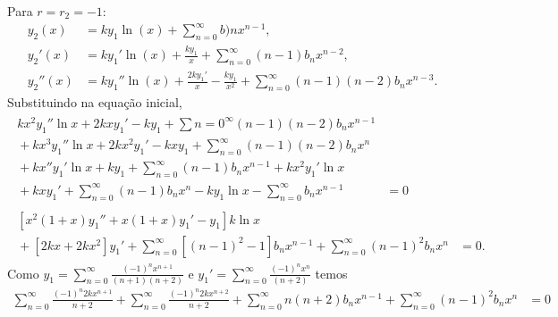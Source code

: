 \documentclass[a4paper,12pt, leqno, answers]{exam}
\begin{document}
\begin{questions}
\begin{solution}
        Para $r = r_2 = -1$:
        \begin{align*}
            y_2(x) &= k y_1 \ln \left( x \right) + \sum_{n = 0}^\infty b)n x^{n - 1}, \\
            y_2'(x) &= k y_1' \ln \left( x \right) + \frac{k y_1}{x} + \sum_{n = 0}^\infty \left( n - 1 \right) b_n x^{n - 2}, \\
            y_2''(x) &= k y_1'' \ln \left( x \right) + \frac{2 k y_1'}{x} - \frac{k y_1}{x^2} + \sum_{n = 0}^\infty \left( n - 1 \right) \left( n - 2 \right) b_n x^{n - 3}.
        \end{align*}
        Substituindo na equa\c{c}\~{a}o inicial,
        \begin{align*}
            \begin{split}
                k x^2 y_1'' \ln x + 2 k x y_1' - k y_1 + \sum{n = 0}^\infty \left( n - 1 \right) \left( n - 2 \right) b_n x^{n - 1} \\ {}+ k x^3 y_1'' \ln x + 2 k x^2 y_1' - k x y_1 + \sum_{n = 0}^\infty \left( n - 1 \right) \left( n - 2 \right) b_n x^n \\ {}+ k x'' y_1' \ln x + k y_1 + \sum_{n = 0}^\infty \left( n - 1 \right) b_n x^{n - 1} + k x^2 y_1' \ln x \\ {}+ k x y_1' + \sum_{n = 0}^\infty \left( n - 1 \right) b_n x^n - k y_1 \ln x - \sum_{n = 0}^\infty b_n x^{n - 1} &= 0
            \end{split} \\
            \begin{split}
                \left[ x^2 \left( 1 + x \right) y_1'' + x \left( 1 + x \right) y_1' - y_1 \right] k \ln x \\ {}+ \left[ 2 k x + 2 k x^2 \right] y_1' + \sum_{n = 0}^\infty \left[ \left( n - 1 \right)^2 - 1 \right] b_n x^{n - 1} + \sum_{n = 0}^\infty \left( n - 1 \right)^2 b_n x^n &= 0.
            \end{split}
        \end{align*}
        Como $y_1 = \sum_{n = 0}^\infty \frac{\left( -1 \right)^n x^{n + 1}}{\left( n + 1 \right) \left( n + 2 \right)}$ e $y_1' = \sum_{n = 0}^\infty \frac{ \left( -1 \right)^n x^n}{\left( n + 2 \right)}$ temos
        \begin{align*}
            \sum_{n = 0}^\infty \frac{\left( -1 \right)^n 2 k x^{n + 1}}{n + 2} + \sum_{n = 0}^\infty \frac{\left( -1 \right)^n 2 k x^{n + 2}}{n + 2} + \sum_{n = 0}^\infty n \left( n + 2 \right) b_n x^{n - 1} + \sum_{n = 0}^\infty \left( n - 1 \right)^2 b_n x^n &= 0 \\

\end{align*}
\end{solution}
\end{questions}
\end{document}
